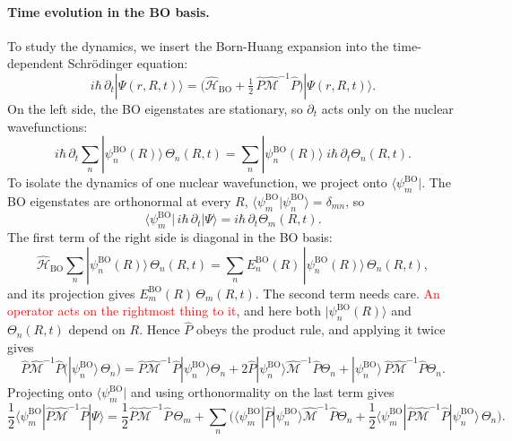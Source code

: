 \documentclass[11pt]{article}      %
\numberwithin{equation}{section}   %
\begin{document}
\paragraph{Time evolution in the BO basis.}
To study the dynamics, we insert the Born-Huang expansion into the
time-dependent Schr\"odinger equation:
\begin{equation}
    i\hbar\,\partial_t|\Psi(r,R,t)\rangle
    =\Big(\hat{\mathcal{H}}_{\mathrm{BO}}
    +\tfrac{1}{2}\,\hat{P}\hat{\mathcal{M}}^{-1}\hat{P}\Big)|\Psi(r,R,t)\rangle .
\end{equation}
On the left side, the BO eigenstates are stationary, so $\partial_t$ acts only
on the nuclear wavefunctions:
\begin{equation}
    i\hbar\,\partial_t\sum_n|\psi^{\mathrm{BO}}_n(R)\rangle\,\Theta_n(R,t)
    =\sum_n|\psi^{\mathrm{BO}}_n(R)\rangle\;i\hbar\,\partial_t\Theta_n(R,t).
\end{equation}
To isolate the dynamics of one nuclear wavefunction, we project onto
$\langle\psi^{\mathrm{BO}}_m|$. The BO eigenstates are orthonormal at every
$R$, $\langle\psi^{\mathrm{BO}}_m|\psi^{\mathrm{BO}}_n\rangle=\delta_{mn}$, so
\begin{equation}
    \langle\psi^{\mathrm{BO}}_m|\,i\hbar\,\partial_t|\Psi\rangle
    =i\hbar\,\partial_t\Theta_m(R,t).
\end{equation}
The first term of the right side is diagonal in the BO basis:
\begin{equation}
    \hat{\mathcal{H}}_{\mathrm{BO}}\sum_n|\psi^{\mathrm{BO}}_n(R)\rangle\,\Theta_n(R,t)
    =\sum_n E^{\mathrm{BO}}_n(R)\,|\psi^{\mathrm{BO}}_n(R)\rangle\,\Theta_n(R,t),
\end{equation}
and its projection gives $E^{\mathrm{BO}}_m(R)\,\Theta_m(R,t)$.
The second term needs care. \textcolor{red}{An operator acts on the rightmost thing to it}, and
here both $|\psi^{\mathrm{BO}}_n(R)\rangle$ and $\Theta_n(R,t)$ depend on $R$.
Hence $\hat{P}$ obeys the product rule, and applying it twice gives
\begin{equation}
    \hat{P}\hat{\mathcal{M}}^{-1}\hat{P}\big(|\psi^{\mathrm{BO}}_n\rangle\,\Theta_n\big)
    =\hat{P}\hat{\mathcal{M}}^{-1}\hat{P}|\psi^{\mathrm{BO}}_n\rangle\Theta_n
    +2\hat{P}|\psi^{\mathrm{BO}}_n\rangle\hat{\mathcal{M}}^{-1}\hat{P}\Theta_n
    +|\psi^{\mathrm{BO}}_n\rangle\,\hat{P}\hat{\mathcal{M}}^{-1}\hat{P}\Theta_n .
\end{equation}
Projecting onto $\langle\psi^{\mathrm{BO}}_m|$ and using orthonormality on the
last term gives
\begin{equation}
    \frac{1}{2}\langle\psi^{\mathrm{BO}}_m|\hat{P}\hat{\mathcal{M}}^{-1}\hat{P}|\Psi\rangle
    =\frac{1}{2}\hat{P}\hat{\mathcal{M}}^{-1}\hat{P}\,\Theta_m
    +\sum_n\bigg(
    \langle\psi^{\mathrm{BO}}_m|\hat{P}|\psi^{\mathrm{BO}}_n\rangle\hat{\mathcal{M}}^{-1}\hat{P}\Theta_n
    +\frac{1}{2}\langle\psi^{\mathrm{BO}}_m|\hat{P}\hat{\mathcal{M}}^{-1}\hat{P}|\psi^{\mathrm{BO}}_n\rangle\,\Theta_n\bigg).
\end{equation}
\end{document}

